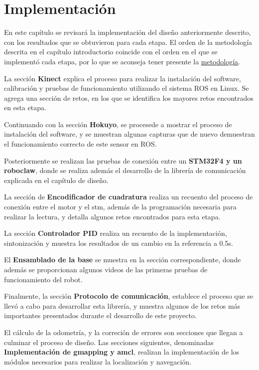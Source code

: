 \chapter{Implementación}

En este capítulo se revisará la implementación del diseño anteriormente descrito, con los resultados que se obtuvieron para cada etapa. El orden de la metodología descrita en el capítulo introductorio coincide con el orden en el que se implementó cada etapa, por lo que se aconseja tener presente la \hyperref[metodología]{metodología}.

La sección \textbf{Kinect} explica el proceso para realizar la instalación del software, calibración y pruebas de funcionamiento utilizando el sistema ROS en Linux. Se agrega una sección de retos, en los que se identifica los mayores retos encontrados en esta etapa.

Continuando con la sección \textbf{Hokuyo}, se procesede a mostrar el proceso de instalación del software, y se muestran algunas capturas que de nuevo demuestran el funcionamiento correcto de este sensor en ROS.

Posteriormente se realizan las pruebas de conexión entre un \textbf{STM32F4 y un roboclaw}, donde se realiza además el desarrollo de la librería de comunicación explicada en el capítulo de diseño.

La sección de \textbf{Encodificador de cuadratura} realiza un recuento del proceso de conexión entre el motor y el stm, además de la programación necesaria para realizar la lectura, y detalla algunos retos encontrados para esta etapa.

La sección \textbf{Controlador PID} realiza un recuento de la implementación, sintonización y muestra los resultados de un cambio en la referencia a 0.5s.

El \textbf{Ensamblado de la base} se muestra en la sección correspondiente, donde además se proporcionan algunos videos de las primeras pruebas de funcionamiento del robot.

Finalmente, la sección \textbf{Protocolo de comunicación}, establece el proceso que se llevó a cabo para desarrollar esta librería, y muestra algunos de los retos más importantes presentados durante el desarrollo de este proyecto.

El cálculo de la odometría, y la correción de errores son secciones que llegan a culminar el proceso de diseño. Las secciones siguientes, denominadas \textbf{Implementación de gmapping y amcl}, realizan la implementación de los módulos necesarios para realizar la localización y navegación.


